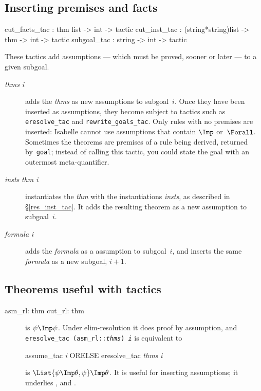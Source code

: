 \subsection{Inserting premises and facts}\label{cut_facts_tac}
\begin{ttbox} 
cut_facts_tac : thm list -> int -> tactic
cut_inst_tac  : (string*string)list -> thm -> int -> tactic
subgoal_tac   : string -> int -> tactic
\end{ttbox}
These tactics add assumptions --- which must be proved, sooner or later ---
to a given subgoal.
\begin{description}
\item[ {\it thms} {\it i}] 
  adds the {\it thms} as new assumptions to subgoal~$i$.  Once they have
  been inserted as assumptions, they become subject to tactics such as {\tt
    eresolve_tac} and {\tt rewrite_goals_tac}.  Only rules with no premises
  are inserted: Isabelle cannot use assumptions that contain $\Imp$
  or~$\Forall$.  Sometimes the theorems are premises of a rule being
  derived, returned by~{\tt goal}; instead of calling this tactic, you
  could state the goal with an outermost meta-quantifier.

\item[ {\it insts} {\it thm} {\it i}]
  instantiates the {\it thm} with the instantiations {\it insts}, as
  described in \S\ref{res_inst_tac}.  It adds the resulting theorem as a
  new assumption to subgoal~$i$. 

\item[ {\it formula} {\it i}] 
adds the {\it formula} as a assumption to subgoal~$i$, and inserts the same
{\it formula} as a new subgoal, $i+1$.
\end{description}


\subsection{Theorems useful with tactics}
\begin{ttbox} 
asm_rl: thm 
cut_rl: thm 
\end{ttbox}
\begin{description}
\item[] 
is $\psi\Imp\psi$.  Under elim-resolution it does proof by assumption, and
\hbox{\tt eresolve_tac (asm_rl::{\it thms}) {\it i}} is equivalent to
\begin{ttbox} 
assume_tac {\it i}  ORELSE  eresolve_tac {\it thms} {\it i}
\end{ttbox}

\item[] 
is $\List{\psi\Imp\theta,\psi}\Imp\theta$.  It is useful for inserting
assumptions; it underlies , 
and .
\end{description}


